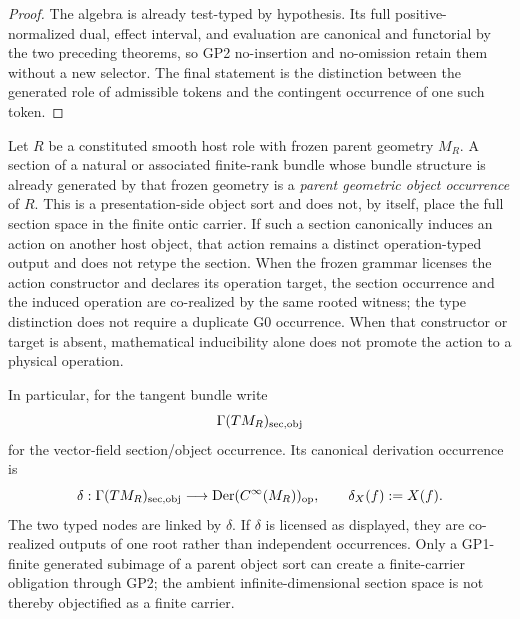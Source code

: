 \documentclass[12pt,a4paper]{article}
\begin{document}
\begin{proof}
The algebra is already test-typed by hypothesis.  Its full positive-normalized
dual, effect interval, and evaluation are canonical and functorial by the two
preceding theorems, so GP2 no-insertion and no-omission retain them without a
new selector.  The final statement is the distinction between the generated
role of admissible tokens and the contingent occurrence of one such token.
\end{proof}

\begin{definition}
\label{p2:def:parent-geometric-object-occurrence}
Let \(R\) be a constituted smooth host role with frozen parent geometry
\(M_R\).  A section of a natural or associated finite-rank bundle whose bundle
structure is already generated by that frozen geometry is a \emph{parent
geometric object occurrence} of \(R\).  This is a presentation-side object
sort and does not, by itself, place the full section space in the finite ontic
carrier.  If such a section canonically induces an action on another host
object, that action remains a distinct operation-typed output and does not
retype the section.  When the frozen grammar licenses the action constructor
and declares its operation target, the section occurrence and the induced
operation are co-realized by the same rooted witness; the type distinction
does not require a duplicate G0 occurrence.  When that constructor or target
is absent, mathematical inducibility alone does not promote the action to a
physical operation.

In particular, for the tangent bundle write
\[
 \Gamma(TM_R)_{\rm sec,obj}
\]
for the vector-field section/object occurrence.  Its canonical derivation
occurrence is
\[
 \delta:\Gamma(TM_R)_{\rm sec,obj}
 \longrightarrow\operatorname{Der}(C^\infty(M_R))_{\rm op},
 \qquad \delta_X(f):=X(f).
\]
The two typed nodes are linked by \(\delta\).  If \(\delta\) is licensed as
displayed, they are co-realized outputs of one root rather than independent
occurrences.
Only a GP1-finite generated subimage of a parent object sort can create a
finite-carrier obligation through GP2; the ambient infinite-dimensional
section space is not thereby objectified as a finite carrier.
\end{definition}
\end{document}
